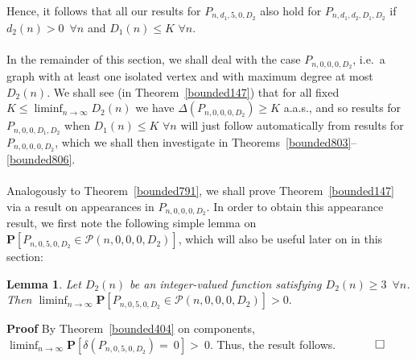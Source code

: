 \documentclass{article}
\newtheorem{Lemma}[Theorem]{Lemma}
\newtheorem{Proof of Theorem}{Proof of Theorem}
\begin{document}
Hence, it follows that
all our results for $P_{n,d_{1},5,0,D_{2}}$ also hold for $P_{n,d_{1},d_{2},D_{1},D_{2}}$
if $d_{2}(n) > 0$~$\forall n$ and $D_{1}(n) \leq K$ $\forall n$. \\
\\






In the remainder of this section,
we shall deal with the case $P_{n,0,0,0,D_{2}}$,
i.e.~a graph with at least one isolated vertex and with maximum degree at most $D_{2}(n)$.
We shall see (in Theorem~\ref{bounded147}) that for all fixed $K \leq \liminf_{n \to \infty} D_{2}(n)$ we have
$\Delta(P_{n,0,0,0,D_{2}}) \geq K$ a.a.s.,
and so results for $P_{n,0,0,D_{1},D_{2}}$ when $D_{1}(n) \leq K$ $\forall n$ will just follow automatically
from results for $P_{n,0,0,0,D_{2}}$,
which we shall then investigate in Theorems~\ref{bounded803}--\ref{bounded806}. \\
\\















Analogously to Theorem~\ref{bounded791},
we shall prove Theorem~\ref{bounded147} via a result on appearances in $P_{n,0,0,0,D_{2}}$.
In order to obtain this appearance result,
we first note the following simple lemma on
$\mathbf{P}[P_{n,0,5,0,D_{2}} \in \mathcal{P}(n,0,0,0,D_{2})]$,
which will also be useful later on in this section:















\begin{Lemma} \label{bounded811}
Let $D_{2}(n)$ be an integer-valued function satisfying $D_{2}(n) \geq 3$~$\forall n$.
Then $\liminf_{n \to \infty} \mathbf{P}[P_{n,0,5,0,D_{2}} \in \mathcal{P}(n,0,0,0,D_{2})]>0.$
\end{Lemma}
\textbf{Proof}
By Theorem~\ref{bounded404} on components,
$\liminf_{n \to \infty} \mathbf{P}[\delta(P_{n,0,5,0,D_{2}})=~0] >~0.$
Thus, the result follows.~$\phantom{qwerty} 
\setlength{\unitlength}{.25cm}
\begin{picture}(1,1)
\put(0,0){\line(1,0){1}}
\put(0,0){\line(0,1){1}}
\put(1,1){\line(-1,0){1}}
\put(1,1){\line(0,-1){1}}
\end{picture}$ \\
\end{document}
